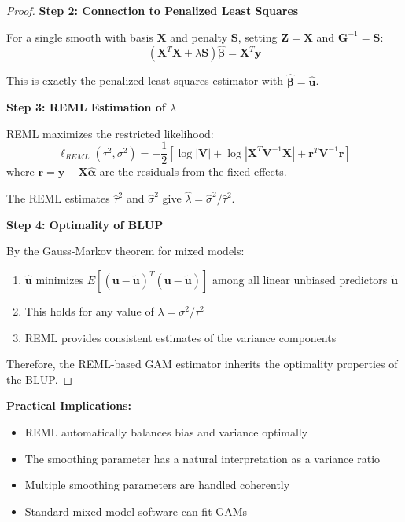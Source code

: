 \documentclass[12pt]{article}
\begin{document}
\begin{proof}
\textbf{Step 2: Connection to Penalized Least Squares}

For a single smooth with basis $\mathbf{X}$ and penalty $\mathbf{S}$, setting $\mathbf{Z} = \mathbf{X}$ and $\mathbf{G}^{-1} = \mathbf{S}$:
\begin{equation}
(\mathbf{X}^T\mathbf{X} + \lambda\mathbf{S})\hat{\boldsymbol{\beta}} = \mathbf{X}^T\mathbf{y}
\end{equation}

This is exactly the penalized least squares estimator with $\hat{\boldsymbol{\beta}} = \hat{\mathbf{u}}$.

\textbf{Step 3: REML Estimation of $\lambda$}

REML maximizes the restricted likelihood:
\begin{equation}
\ell_{REML}(\tau^2, \sigma^2) = -\frac{1}{2}\left[\log|\mathbf{V}| + \log|\mathbf{X}^T\mathbf{V}^{-1}\mathbf{X}| + \mathbf{r}^T\mathbf{V}^{-1}\mathbf{r}\right]
\end{equation}
where $\mathbf{r} = \mathbf{y} - \mathbf{X}\hat{\boldsymbol{\alpha}}$ are the residuals from the fixed effects.

The REML estimates $\hat{\tau}^2$ and $\hat{\sigma}^2$ give $\hat{\lambda} = \hat{\sigma}^2/\hat{\tau}^2$.

\textbf{Step 4: Optimality of BLUP}

By the Gauss-Markov theorem for mixed models:
\begin{enumerate}
    \item $\hat{\mathbf{u}}$ minimizes $E[(\mathbf{u} - \tilde{\mathbf{u}})^T(\mathbf{u} - \tilde{\mathbf{u}})]$ among all linear unbiased predictors $\tilde{\mathbf{u}}$
    \item This holds for any value of $\lambda = \sigma^2/\tau^2$
    \item REML provides consistent estimates of the variance components
\end{enumerate}

Therefore, the REML-based GAM estimator inherits the optimality properties of the BLUP.
\end{proof}

\textbf{Practical Implications:}
\begin{itemize}
    \item REML automatically balances bias and variance optimally
    \item The smoothing parameter has a natural interpretation as a variance ratio
    \item Multiple smoothing parameters are handled coherently
    \item Standard mixed model software can fit GAMs
\end{itemize}
\end{document}
